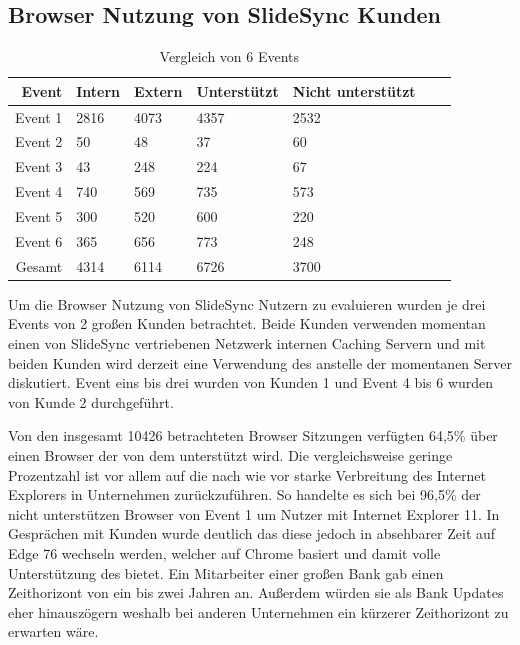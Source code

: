 \subsection{Browser Nutzung von SlideSync Kunden}

\begin{table}[!htb]\label{table-browser-slidesync}
\begin{center}

	\begin{tabular}{|r|l|l|l|l|l|l|}
		\hline
		Event	 & Intern 	& Extern 	& Unterstützt & Nicht unterstützt \\ \hline
		Event 1	 & 2816		& 4073	  	& 4357		  & 2532		\\ \hline 
		Event 2	 & 50		& 48		 	& 37			  & 60		\\ \hline 
		Event 3	 & 43		& 248	  	& 224		  & 67		\\ \hline 
		Event 4	 & 740		& 569	  	& 735		  & 573		\\ \hline 
		Event 5	 & 300		& 520	  	& 600		  & 220		\\ \hline 
		Event 6	 & 365		& 656	  	& 773		  & 248		\\ \hline 
		Gesamt	 & 4314		& 6114	  	& 6726		  & 3700		\\ \hline 

	\end{tabular}
	\caption{Vergleich von 6 Events}
\end{center}

\end{table}

Um die Browser Nutzung von SlideSync Nutzern zu evaluieren wurden je drei Events von 2 großen Kunden betrachtet. Beide Kunden verwenden momentan einen von SlideSync vertriebenen Netzwerk internen Caching Servern und mit beiden Kunden wird derzeit eine Verwendung des \pTp \cdns anstelle der momentanen \cdn Server diskutiert. Event eins bis drei wurden von Kunden 1 und Event 4 bis 6 wurden von Kunde 2 durchgeführt. 

 Von den insgesamt 10426 betrachteten Browser Sitzungen verfügten 64,5\% über einen Browser der von dem \pTp \cdn unterstützt wird. Die vergleichsweise geringe Prozentzahl ist vor allem auf die nach wie vor starke Verbreitung des Internet Explorers in Unternehmen zurückzuführen. So handelte es sich bei 96,5\% der nicht unterstützen Browser von Event 1 um Nutzer mit Internet Explorer 11. In Gesprächen mit Kunden wurde deutlich das diese jedoch in absehbarer Zeit auf Edge 76 wechseln werden, welcher auf Chrome basiert und damit volle Unterstützung des \cdns bietet.\cite{edge-chrome} Ein Mitarbeiter einer großen Bank gab einen Zeithorizont von ein bis zwei Jahren an. Außerdem würden sie als Bank Updates eher hinauszögern weshalb bei anderen Unternehmen ein kürzerer Zeithorizont zu erwarten wäre.

